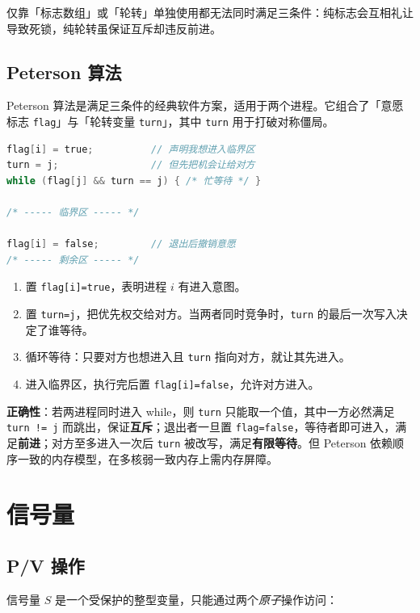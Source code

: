 仅靠「标志数组」或「轮转」单独使用都无法同时满足三条件：纯标志会互相礼让导致死锁，纯轮转虽保证互斥却违反前进。

\subsection{Peterson 算法}

Peterson 算法是满足三条件的经典软件方案，适用于两个进程。它组合了「意愿标志 \texttt{flag}」与「轮转变量 \texttt{turn}」，其中 \texttt{turn} 用于打破对称僵局。

\begin{lstlisting}[language=C, caption={Peterson 算法（进程 $i$，对方为 $j = 1-i$）}]
flag[i] = true;          // 声明我想进入临界区
turn = j;                // 但先把机会让给对方
while (flag[j] && turn == j) { /* 忙等待 */ }

/* ----- 临界区 ----- */

flag[i] = false;         // 退出后撤销意愿
/* ----- 剩余区 ----- */
\end{lstlisting}

\begin{enumerate}
    \item 置 \texttt{flag[i]=true}，表明进程 $i$ 有进入意图。
    \item 置 \texttt{turn=j}，把优先权交给对方。当两者同时竞争时，\texttt{turn} 的最后一次写入决定了谁等待。
    \item 循环等待：只要对方也想进入且 \texttt{turn} 指向对方，就让其先进入。
    \item 进入临界区，执行完后置 \texttt{flag[i]=false}，允许对方进入。
\end{enumerate}

\textbf{正确性}：若两进程同时进入 while，则 \texttt{turn} 只能取一个值，其中一方必然满足 \texttt{turn != j} 而跳出，保证\textbf{互斥}；退出者一旦置 \texttt{flag=false}，等待者即可进入，满足\textbf{前进}；对方至多进入一次后 \texttt{turn} 被改写，满足\textbf{有限等待}。但 Peterson 依赖顺序一致的内存模型，在多核弱一致内存上需内存屏障。

\section{信号量}

\subsection{P/V 操作}

信号量 $S$ 是一个受保护的整型变量，只能通过两个\emph{原子}操作访问：

